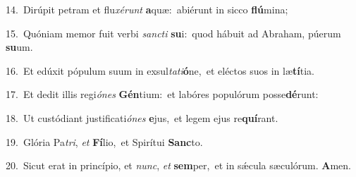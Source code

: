 {\numbfont\textcolor{\numbcolor}{14.}}~Dirúpit petram et flu\-\textit{xé}\-\textit{runt} \textbf{a}\-quæ:~\star abiérunt in sicco \textbf{flú}\-mina;\par
{\numbfont\textcolor{\numbcolor}{15.}}~Quóniam memor fuit verbi \textit{sanc}\-\textit{ti} \textbf{su}\-i:~\star quod hábuit ad Abraham, púerum \textbf{su}\-um.\par
{\numbfont\textcolor{\numbcolor}{16.}}~Et edúxit pópulum suum in exsul\-\textit{ta}\-\textit{ti}\textbf{ó}ne,~\star et eléctos suos in læ\-\textbf{tí}\-tia.\par
{\numbfont\textcolor{\numbcolor}{17.}}~Et dedit illis regi\-\textit{ó}\-\textit{nes} \textbf{Gén}\-tium:~\star et labóres populórum posse\-\textbf{dé}\-runt:\par
{\numbfont\textcolor{\numbcolor}{18.}}~Ut custódiant justificati\-\textit{ó}\-\textit{nes} \textbf{e}\-jus,~\star et legem ejus re\-\textbf{quí}\-rant.\par
{\numbfont\textcolor{\numbcolor}{19.}}~Glória Pa\-\textit{tri}\-, \textit{et} \textbf{Fí}\-lio,~\star et Spirítui \textbf{Sanc}\-to.\par
{\numbfont\textcolor{\numbcolor}{20.}}~Sicut erat in princípio, et \textit{nunc}\-, \textit{et} \textbf{sem}\-per,~\star et in sǽcula sæculórum. \textbf{A}\-men.\par
